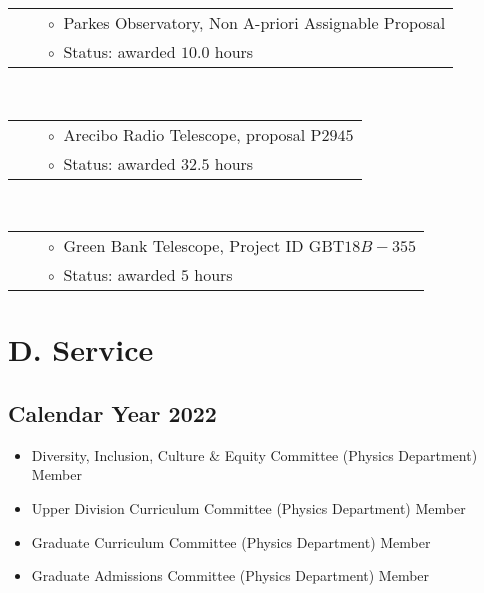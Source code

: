\documentclass[11pt,letterpaper,sans,unicode]{moderncv}
\newcommand{\confitem}[2]{\item #1 \hfill #2} %
\begin{document}
{
\begin{tabular}{rcl}
&\hspace{0.4cm} &{\color{color1} $\circ\;\;$}Parkes Observatory, Non A-priori Assignable Proposal \\
&\hspace{0.4cm} &{\color{color1} $\circ\;\;$}Status: awarded $10.0$ hours
\end{tabular} \\

\begin{tabular}{rcl}
&\hspace{0.4cm} &{\color{color1} $\circ\;\;$}Arecibo Radio Telescope, proposal P$2945$ \\
&\hspace{0.4cm} &{\color{color1} $\circ\;\;$}Status: awarded $32.5$ hours
\end{tabular} \\

\begin{tabular}{rcl}
&\hspace{0.4cm} &{\color{color1} $\circ\;\;$}Green Bank Telescope, Project ID GBT$18B-355$ \\
&\hspace{0.4cm} &{\color{color1} $\circ\;\;$}Status: awarded $5$ hours
\end{tabular}
}

\section{D. Service}
\subsection{Calendar Year 2022}
\begin{itemize}[leftmargin=8mm]
\confitem{Diversity, Inclusion, Culture \& Equity Committee (Physics Department)}{Member}
\confitem{Upper Division Curriculum Committee (Physics Department)}{Member}
\confitem{Graduate Curriculum Committee (Physics Department)}{Member}
\confitem{Graduate Admissions Committee (Physics Department)}{Member}
\end{itemize}
\end{document}
